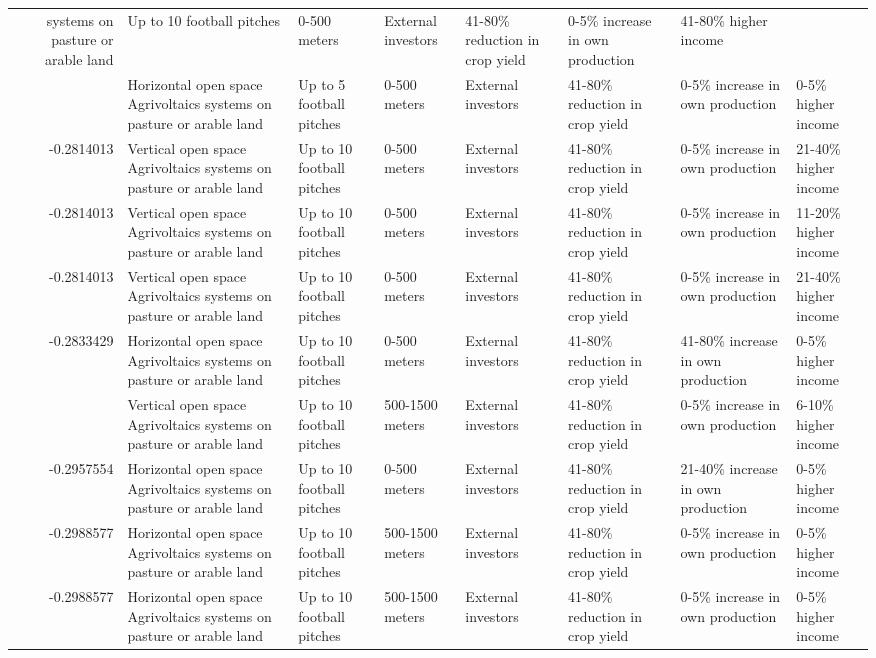 \begin{table}
\begin{tabular}[t]{rlllllll}
systems on pasture or arable land & Up to 10 football pitches & 0-500 meters & External investors & 41-80\% reduction in crop yield & 0-5\% increase in own production & 41-80\% higher income\\
\addlinespace
-0.2769483 & Horizontal open space Agrivoltaics
systems on pasture or arable land & Up to 5 football pitches & 0-500 meters & External investors & 41-80\% reduction in crop yield & 0-5\% increase in own production & 0-5\% higher income\\
-0.2814013 & Vertical open space Agrivoltaics
systems on pasture or arable land & Up to 10 football pitches & 0-500 meters & External investors & 41-80\% reduction in crop yield & 0-5\% increase in own production & 21-40\% higher income\\
-0.2814013 & Vertical open space Agrivoltaics
systems on pasture or arable land & Up to 10 football pitches & 0-500 meters & External investors & 41-80\% reduction in crop yield & 0-5\% increase in own production & 11-20\% higher income\\
-0.2814013 & Vertical open space Agrivoltaics
systems on pasture or arable land & Up to 10 football pitches & 0-500 meters & External investors & 41-80\% reduction in crop yield & 0-5\% increase in own production & 21-40\% higher income\\
-0.2833429 & Horizontal open space Agrivoltaics
systems on pasture or arable land & Up to 10 football pitches & 0-500 meters & External investors & 41-80\% reduction in crop yield & 41-80\% increase in own production & 0-5\% higher income\\
\addlinespace
-0.2892028 & Vertical open space Agrivoltaics
systems on pasture or arable land & Up to 10 football pitches & 500-1500 meters & External investors & 41-80\% reduction in crop yield & 0-5\% increase in own production & 6-10\% higher income\\
-0.2957554 & Horizontal open space Agrivoltaics
systems on pasture or arable land & Up to 10 football pitches & 0-500 meters & External investors & 41-80\% reduction in crop yield & 21-40\% increase in own production & 0-5\% higher income\\
-0.2988577 & Horizontal open space Agrivoltaics
systems on pasture or arable land & Up to 10 football pitches & 500-1500 meters & External investors & 41-80\% reduction in crop yield & 0-5\% increase in own production & 0-5\% higher income\\
-0.2988577 & Horizontal open space Agrivoltaics
systems on pasture or arable land & Up to 10 football pitches & 500-1500 meters & External investors & 41-80\% reduction in crop yield & 0-5\% increase in own production & 0-5\% higher income\\

\end{tabular}
\end{table}
